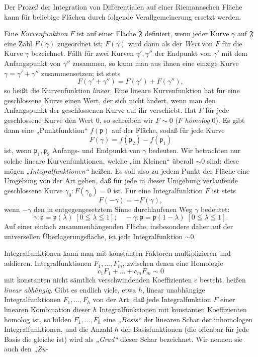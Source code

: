 \documentclass{article}
\begin{document}
Der Prozeß der Integration von Differentialen auf einer Riemannschen Fläche kann für beliebige Flächen durch folgende Verallgemeinerung ersetzt werden.

Eine \emph{Kurvenfunktion} $F$ ist auf einer Fläche $\mathfrak{F}$ definiert, wenn jeder Kurve $\gamma$ auf $\mathfrak{F}$ eine Zahl $F(\gamma)$ zugeordnet ist; $F(\gamma)$ wird dann als der \emph{Wert} von $F$ für die Kurve $\gamma$ bezeichnet. Fällt für zwei Kurven $\gamma', \gamma''$ der Endpunkt von $\gamma'$ mit dem Anfangspunkt von $\gamma''$ zusammen, so kann man aus ihnen eine einzige Kurve $\gamma = \gamma' + \gamma''$ zusammensetzen; ist stets
\[ F(\gamma' + \gamma'') = F(\gamma') + F(\gamma''), \]
so heißt die Kurvenfunktion \emph{linear}. Eine lineare Kurvenfunktion hat für eine geschlossene Kurve einen Wert, der sich nicht ändert, wenn man den Anfangspunkt der geschlossenen Kurve auf ihr verschiebt. Hat $F$ für jede geschlossene Kurve den Wert $0$, so schreiben wir $F \sim 0$ ($F$ \emph{homolog} $0$). Es gibt dann eine „Punktfunktion“ $f(\mathfrak{p})$ auf der Fläche, sodaß für jede Kurve
\[ F(\gamma) = f(\mathfrak{p}_2) - f(\mathfrak{p}_1) \]
ist, wenn $\mathfrak{p}_1, \mathfrak{p}_2$ Anfangs- und Endpunkt von $\gamma$ bedeuten. Wir betrachten nur solche lineare Kurvenfunktionen, welche „im Kleinen“ überall $\sim 0$ sind; diese mögen \emph{„Integralfunktionen“} heißen. Es soll also zu jedem Punkt der Fläche eine Umgebung von der Art geben, daß für jede in dieser Umgebung verlaufende geschlossene Kurve $\gamma_0\colon F(\gamma_0) = 0$ ist. Für eine Integralfunktion $F$ ist stets
\[ F(-\gamma) = - F(\gamma), \]
wenn $-\gamma$ den in entgegengesetztem Sinne durchlaufenen Weg $\gamma$ bedeutet:
\[ \gamma\colon \mathfrak{p} = \mathfrak{p}(\lambda) \; [0 \leqq \lambda \leqq 1]; \quad -\gamma\colon \mathfrak{p} = \mathfrak{p}(1 - \lambda) \; [0 \leqq \lambda \leqq 1]. \]
Auf einer einfach zusammenhängenden Fläche, insbesondere daher auf der universellen Überlagerungsfläche, ist jede Integralfunktion $\sim 0$.

Integralfunktionen kann man mit konstanten Faktoren multiplizieren und addieren. Integralfunktionen $F_1, \dots, F_m$, zwischen denen eine Homologie
\[ c_1 F_1 + \dots + c_m F_m \sim 0 \]
mit konstanten nicht sämtlich verschwindenden Koeffizienten $c$ besteht, heißen \emph{linear abhängig}. Gibt es endlich viele, etwa $h$, linear unabhängige Integralfunktionen $F_1, \dots, F_h$ von der Art, daß jede Integralfunktion $F$ einer linearen Kombination dieser $h$ Integralfunktionen mit konstanten Koeffizienten homolog ist, so bilden $F_1, \dots, F_h$ eine \emph{„Basis“} der linearen Schar der inhomologen Integralfunktionen, und die Anzahl $h$ der Basisfunktionen (die offenbar für jede Basis die gleiche ist) wird als \emph{„Grad“} dieser Schar bezeichnet. Wir nennen sie auch den \emph{„Zu-}
\end{document}
